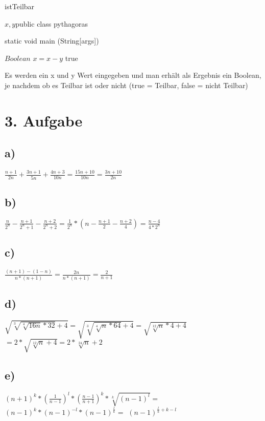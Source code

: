 \documentclass{article}
\begin{document}
    \begin{algorithm}
    \caption{istTeilbar}\label{alg:cap}
    \begin{algorithmic}
    \Require $x,y$public class pythagoras {
        static void main (String[args]) {
            
        }
    
    }
    \Ensure $Boolean$
            \State $x = x - y$
         {
        true} 
    \end{algorithmic}
    \end{algorithm}\newline
    Es werden ein x und y Wert eingegeben und man erhält als Ergebnis ein Boolean, je nachdem ob es Teilbar ist oder nicht (true = Teilbar, false = nicht Teilbar)
    

\section*{3. Aufgabe}

    

    \subsection*{a)} 
    $\frac{n+1}{2n} + \frac{3n+1}{5n} + \frac{4n+3}{10n} = \frac{15n+10}{10n} = \frac{3n+10}{2n}$
    \subsection*{b)}
    $\frac{n}{2^n} - \frac{n+1}{2^n+1} - \frac{n+2}{2^n+2} = \frac{1}{2^n} * (n - \frac{n+1}{2} - \frac{n+2}{4}) = \frac{n-4}{4*2^n}$
    \subsection*{c)}
    $\frac{(n+1)-(1-n)}{n*(n+1)} = \frac{2n}{n*(n+1)} = \frac{2}{n+1}$
    \subsection*{d)}
    $\sqrt{\sqrt[3]{\sqrt[4]{16n}*32}+4} = \sqrt{\sqrt[3]{\sqrt[4]{n}*64}+4} = \sqrt{\sqrt[12]{n}*4+4}$
    \newline
    $ = 2 * \sqrt{\sqrt[12]{n}+4} = 2 * \sqrt[24]{n}+2$
    \subsection*{e)}
    $(n+1)^k * (\frac{1}{n-1})^l * (\frac{n-1}{n+1})^k * \sqrt[k]{(n-1)^l} =$ \newline
    $(n-1)^k * (n-1)^{-l} * (n-1)^{\frac{l}{k}} =$ \newline
    $(n-1)^{\frac{l}{k} + k - l}$ \newpage
\end{document}
